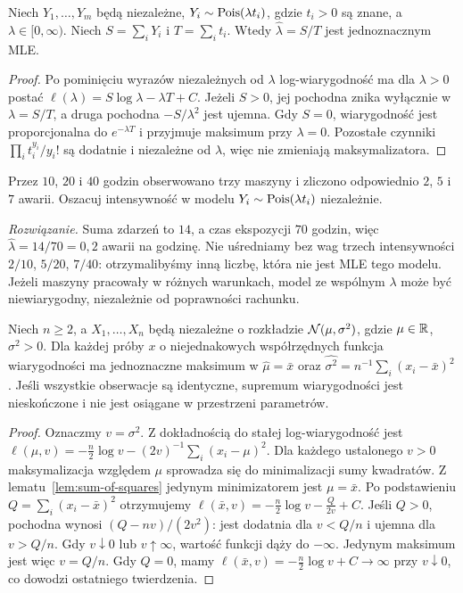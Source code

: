 \begin{twierdzenie}\label{thm:mle-pois}
Niech $Y_1,\ldots,Y_m$ będą niezależne, $Y_i\sim\operatorname{Pois}(\lambda t_i)$,
gdzie $t_i>0$ są znane, a $\lambda\in[0,\infty)$. Niech
$S=\sum_iY_i$ i $T=\sum_i t_i$. Wtedy
$\widehat\lambda=S/T$ jest jednoznacznym MLE.
\end{twierdzenie}
\begin{proof}
Po pominięciu wyrazów niezależnych od $\lambda$ log-wiarygodność ma dla
$\lambda>0$ postać $\ell(\lambda)=S\log\lambda-\lambda T+C$.
Jeżeli $S>0$, jej pochodna znika wyłącznie w $\lambda=S/T$, a druga
pochodna $-S/\lambda^2$ jest ujemna. Gdy $S=0$, wiarygodność jest
proporcjonalna do $e^{-\lambda T}$ i przyjmuje maksimum przy $\lambda=0$.
Pozostałe czynniki $\prod_i t_i^{y_i}/y_i!$ są dodatnie i niezależne
od $\lambda$, więc nie zmieniają maksymalizatora.
\end{proof}

\begin{zadanie}
Przez $10$, $20$ i $40$ godzin obserwowano trzy maszyny i zliczono
odpowiednio $2$, $5$ i $7$ awarii. Oszacuj intensywność w modelu
$Y_i\sim\operatorname{Pois}(\lambda t_i)$ niezależnie.
\par\emph{Rozwiązanie.} Suma zdarzeń to $14$, a czas ekspozycji $70$
godzin, więc $\widehat\lambda=14/70=0{,}2$ awarii na godzinę.
Nie uśredniamy bez wag trzech intensywności $2/10$, $5/20$, $7/40$:
otrzymalibyśmy inną liczbę, która nie jest MLE tego modelu.
Jeżeli maszyny pracowały w różnych warunkach, model ze wspólnym
$\lambda$ może być niewiarygodny, niezależnie od poprawności rachunku.
\end{zadanie}

\begin{twierdzenie}\label{thm:mle-normal}
Niech $n\ge2$, a $X_1,\ldots,X_n$ będą niezależne o rozkładzie
$\mathcal N(\mu,\sigma^2)$, gdzie $\mu\in\mathbb R$, $\sigma^2>0$. Dla każdej
próby $x$ o niejednakowych współrzędnych funkcja wiarygodności ma
jednoznaczne maksimum w
$\widehat\mu=\bar x$ oraz
$\widehat{\sigma^2}=n^{-1}\sum_i(x_i-\bar x)^2$.
Jeśli wszystkie obserwacje są identyczne, supremum wiarygodności jest
nieskończone i nie jest osiągane w przestrzeni parametrów.
\end{twierdzenie}
\begin{proof}
Oznaczmy $v=\sigma^2$. Z dokładnością do stałej log-wiarygodność jest
$\ell(\mu,v)=-\frac n2\log v-(2v)^{-1}\sum_i(x_i-\mu)^2$.
Dla każdego ustalonego $v>0$ maksymalizacja względem $\mu$ sprowadza się
do minimalizacji sumy kwadratów. Z lematu~\ref{lem:sum-of-squares}
jedynym minimizatorem jest $\mu=\bar x$. Po podstawieniu
$Q=\sum_i(x_i-\bar x)^2$ otrzymujemy
$\ell(\bar x,v)=-\frac n2\log v-\frac Q{2v}+C$.
Jeśli $Q>0$, pochodna wynosi $(Q-nv)/(2v^2)$: jest dodatnia dla
$v<Q/n$ i ujemna dla $v>Q/n$. Gdy $v\downarrow0$ lub $v\uparrow\infty$,
wartość funkcji dąży do $-\infty$. Jedynym maksimum jest więc $v=Q/n$.
Gdy $Q=0$, mamy $\ell(\bar x,v)=-\frac n2\log v+C\to\infty$
przy $v\downarrow0$, co dowodzi ostatniego twierdzenia.
\end{proof}

